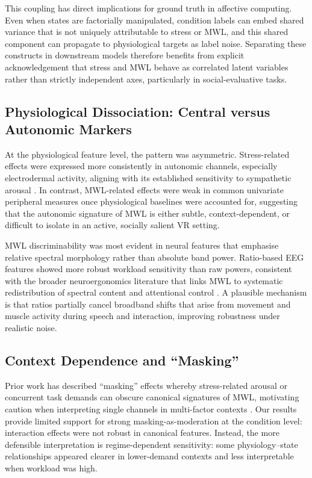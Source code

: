 \documentclass[lettersize,journal]{IEEEtran}
\begin{document}
This coupling has direct implications for ground truth in affective computing. Even when states are factorially manipulated, condition labels can embed shared variance that is not uniquely attributable to stress or MWL, and this shared component can propagate to physiological targets as label noise. Separating these constructs in downstream models therefore benefits from explicit acknowledgement that stress and MWL behave as correlated latent variables rather than strictly independent axes, particularly in social-evaluative tasks.

\subsection{Physiological Dissociation: Central versus Autonomic Markers}
At the physiological feature level, the pattern was asymmetric. Stress-related effects were expressed more consistently in autonomic channels, especially electrodermal activity, aligning with its established sensitivity to sympathetic arousal \cite{faircloughFundamentalsPhysiologicalComputing2009, masiStressWorkloadAssessment2023}. In contrast, MWL-related effects were weak in common univariate peripheral measures once physiological baselines were accounted for, suggesting that the autonomic signature of MWL is either subtle, context-dependent, or difficult to isolate in an active, socially salient VR setting.

MWL discriminability was most evident in neural features that emphasise relative spectral morphology rather than absolute band power. Ratio-based EEG features showed more robust workload sensitivity than raw powers, consistent with the broader neuroergonomics literature that links MWL to systematic redistribution of spectral content and attentional control \cite{putman_eeg_2014}. A plausible mechanism is that ratios partially cancel broadband shifts that arise from movement and muscle activity during speech and interaction, improving robustness under realistic noise.

\subsection{Context Dependence and ``Masking''}
Prior work has described ``masking'' effects whereby stress-related arousal or concurrent task demands can obscure canonical signatures of MWL, motivating caution when interpreting single channels in multi-factor contexts \cite{conwayEffectStressCognitive2013, setzDiscriminatingStressCognitive2010}. Our results provide limited support for strong masking-as-moderation at the condition level: interaction effects were not robust in canonical features. Instead, the more defensible interpretation is regime-dependent sensitivity: some physiology--state relationships appeared clearer in lower-demand contexts and less interpretable when workload was high.
\end{document}
